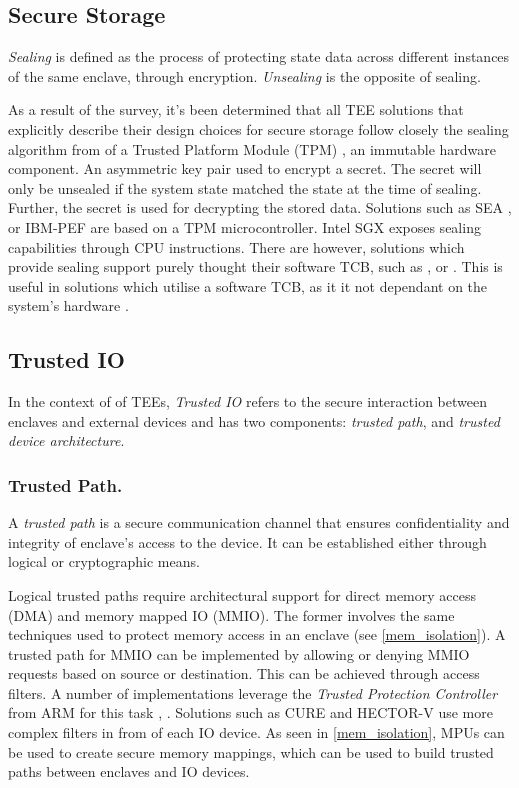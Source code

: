 \documentclass[runningheads,a4paper]{uwsese}
\begin{document}
\subsection{Secure Storage}

\emph{Sealing} is defined as the process of protecting state data across different 
instances of the same enclave, through encryption. \emph{Unsealing} is the opposite 
of sealing.

As a result of the survey, it's been determined that all TEE solutions that
explicitly describe their design choices for secure storage follow closely the
sealing algorithm from of a Trusted Platform Module (TPM)
\cite{trust_plat_mod}, an immutable hardware component. An asymmetric key pair
used to encrypt a secret. The secret will only be unsealed if the system state
matched the state at the time of sealing. Further, the secret is used for
decrypting the stored data. Solutions such as SEA \cite{sea_minimal_tcb}, or
IBM-PEF \cite{ibm_pef} are based on a TPM microcontroller. Intel SGX
\cite{intel_sgx} exposes sealing capabilities through CPU instructions. There
are however, solutions which provide sealing support purely thought their
software TCB, such as \cite{optee}, or \cite{tee_timber}. This is useful in
solutions which utilise a software TCB, as it it not dependant on the system's
hardware \cite{tee_hw_sup}.

\subsection{Trusted IO}

In the context of of TEEs, \emph{Trusted IO} refers to the secure interaction
between enclaves and external devices and has two components: \emph{trusted path},
and \emph{trusted device architecture}.

\subsubsection{Trusted Path.}

A \emph{trusted path} is a secure communication channel that ensures
confidentiality and integrity of enclave's access to the device. It can be
established either through logical or cryptographic means.

Logical trusted paths require architectural support for direct memory access
(DMA) and memory mapped IO (MMIO). The former involves the same techniques used
to protect memory access in an enclave (see \ref{mem_isolation}). A trusted path for
MMIO can be implemented by allowing or denying MMIO requests based on source or
destination. This can be achieved through access filters. A number of
implementations leverage the \emph{Trusted Protection Controller} from ARM for
this task \cite{tee_truz_droid}, \cite{tee_vbutton}. Solutions such as CURE
\cite{tee_cure} and HECTOR-V \cite{tee_hector_v} use more complex filters in
from of each IO device. As seen in \ref{mem_isolation}, MPUs can be used to
create secure memory mappings, which can be used to build trusted paths between
enclaves and IO devices.
\end{document}
